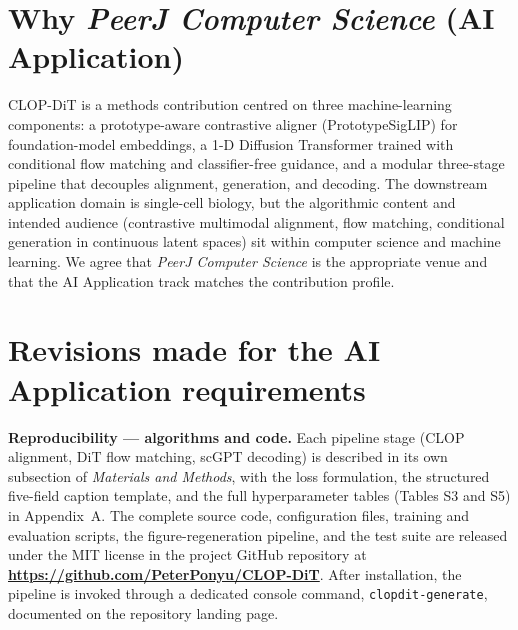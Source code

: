 \documentclass[11pt,letterpaper]{article}
\begin{document}
\section*{Why \emph{PeerJ Computer Science} (AI Application)}

CLOP-DiT is a methods contribution centred on three machine-learning components: a prototype-aware contrastive aligner (PrototypeSigLIP) for foundation-model embeddings, a 1-D Diffusion Transformer trained with conditional flow matching and classifier-free guidance, and a modular three-stage pipeline that decouples alignment, generation, and decoding. The downstream application domain is single-cell biology, but the algorithmic content and intended audience (contrastive multimodal alignment, flow matching, conditional generation in continuous latent spaces) sit within computer science and machine learning. We agree that \emph{PeerJ Computer Science} is the appropriate venue and that the AI Application track matches the contribution profile.

\section*{Revisions made for the AI Application requirements}

\noindent\textbf{Reproducibility --- algorithms and code.} Each pipeline stage (CLOP alignment, DiT flow matching, scGPT decoding) is described in its own subsection of \emph{Materials and Methods}, with the loss formulation, the structured five-field caption template, and the full hyperparameter tables (Tables S3 and S5) in Appendix~A. The complete source code, configuration files, training and evaluation scripts, the figure-regeneration pipeline, and the test suite are released under the MIT license in the project GitHub repository at \textbf{\url{https://github.com/PeterPonyu/CLOP-DiT}}. After installation, the pipeline is invoked through a dedicated console command, \texttt{clopdit-generate}, documented on the repository landing page.
\end{document}

